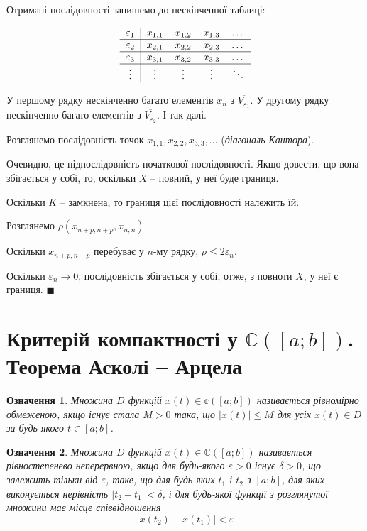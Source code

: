 \documentclass[14pt,twoside]{extreport}
\theoremstyle{mystyle}
\newtheorem{dfn}{Означення}
\renewenvironment{proof}{{\bfseries Доведення.}}{$\blacksquare$}
\numberwithin{equation}{chapter}
\newcommand{\cab}{\mathbb{C}([a; b])}
\begin{document}
\begin{proof}
	Отримані послідовності запишемо до нескінченної таблиці:
	
	\[\begin{tabular}{c|cccc}
	$\varepsilon_1$ & $x_{1, 1}$ & $x_{1, 2}$ & $x_{1, 3}$ & \ldots \\
	\hline
	$\varepsilon_2$ & $x_{2, 1}$ & $x_{2, 2}$ & $x_{2, 3}$ & \ldots \\
	\hline
	$\varepsilon_3$ & $x_{3, 1}$ & $x_{3, 2}$ & $x_{3, 3}$ & \ldots \\
	\hline
	$\vdots$ & $\vdots$ & $\vdots$ & $\vdots$ & $\ddots$ \\
	\end{tabular}
	\]
	
	У першому рядку нескінченно багато елементів $x_n$ з $\overline{V_{\varepsilon_1}}$. У другому рядку нескінченно багато елементів з $\overline{V_{\varepsilon_2}}$. І так далі.
	
	Розглянемо послідовність точок $x_{1, 1}, x_{2, 2}, x_{3, 3}, \ldots$ (\emph{діагональ Кантора}).
	
	Очевидно, це підпослідовність початкової послідовності. Якщо довести, що вона збігається у собі, то, оскільки $X$ -- повний, у неї буде границя.
	
	Оскільки $K$ -- замкнена, то границя цієї послідовності належить їй.
	
	Розглянемо $\rho(x_{n + p, n + p}, x_{n, n})$.
	
	Оскільки $x_{n + p, n + p}$ перебуває у $n$-му рядку, $\rho \leqslant 2\varepsilon_n$.
	
	Оскільки $\varepsilon_n \to 0$, послідовність збігається у собі, отже, з повноти $X$, у неї є границя.
\end{proof}


\section{Критерій компактності у \texorpdfstring{$\cab$}{C([a; b])}. Теорема Асколі -- Арцела}

\begin{dfn}
	Множина $D$ функцій $x(t) \in \mathbb{c}([a; b])$ називається рівномірно обмеженою, якщо існує стала $M>0$ така, що $|x(t)| \leqslant M$ для усіх $x(t) \in D$ за будь-якого $t \in [a; b]$.
\end{dfn}
\begin{dfn}
	Множина $D$ функцій $x(t) \in \cab$ називається рівностепенево неперервною, якщо для будь-якого $\varepsilon > 0$ існує $\delta > 0$, що залежить тільки від $\varepsilon$, таке, що для будь-яких $t_1$ і $t_2$ з $[a; b]$, для яких виконується нерівність $|t_2 - t_1| < \delta$, і для будь-якої функції з розглянутої множини має місце співвідношення
	\[|x(t_2) - x(t_1)|<\varepsilon\]
\end{dfn}
\end{document}
